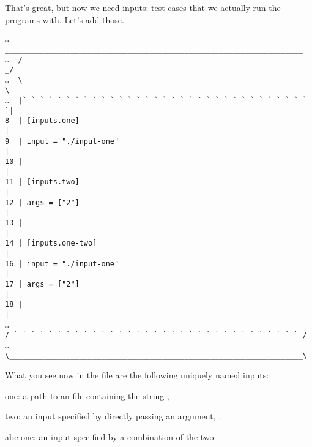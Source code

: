 \documentclass[a4paper,english]{article}
\begin{document}
\begin{adjustwidth}{18pt}{0pt}
%
%

    That's great, but now we need inputs: test cases that we actually run the
    programs with.
    Let's add those.

    \begin{verbatim}
…   ____________________________________________________________________
…  /_ _ _ _ _ _ _ _ _ _ _ _ _ _ _ _ _ _ _ _ _ _ _ _ _ _ _ _ _ _ _ _ _ _/
…  \                                                                   \
…  |` ` ` ` ` ` ` ` ` ` ` ` ` ` ` ` ` ` ` ` ` ` ` ` ` ` ` ` ` ` ` ` ` `|
8  | [inputs.one]                                                      |
9  | input = "./input-one"                                             |
10 |                                                                   |
11 | [inputs.two]                                                      |
12 | args = ["2"]                                                      |
13 |                                                                   |
14 | [inputs.one-two]                                                  |
16 | input = "./input-one"                                             |
17 | args = ["2"]                                                      |
18 |                                                                   |
…  /_`_`_`_`_`_`_`_`_`_`_`_`_`_`_`_`_`_`_`_`_`_`_`_`_`_`_`_`_`_`_`_`_`_/
…  \___________________________________________________________________\
    \end{verbatim}

    What you see now in the file are the following uniquely named inputs:
    \begin{Description}[inputs]\setlength{\itemsep}{0cm}
    \item[one:] a path to an \File{./input-one} file containing the string ,
    \item[two:] an input specified by directly passing an argument, ,
    \item[abc-one:] an input specified by a combination of the two.
    \end{Description}


\end{adjustwidth}
\end{document}
